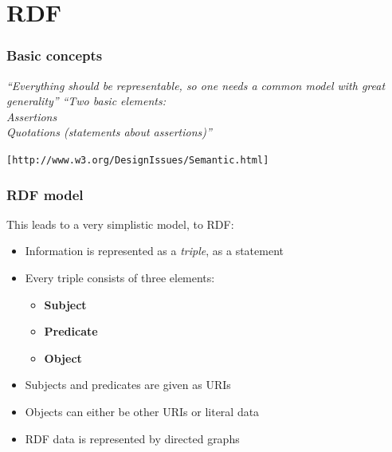 \documentclass[handout]{beamer}
\begin{document}
    \section{RDF}

        \begin{frame}
            \frametitle{Basic concepts}

            \large
            \textit{``Everything should be representable, so one needs a common model with great generality''}
            \vskip 0.3cm
            \textit{``Two basic elements:\\
            Assertions\\
            Quotations (statements about assertions)''}
            \vskip 0.3cm
            \begin{flushright}
                \texttt{[http://www.w3.org/DesignIssues/Semantic.html]}
            \end{flushright}
        \end{frame}


        \begin{frame}
            \frametitle{RDF model}

            This leads to a very simplistic model, to RDF:
            \vskip 0.7cm
            \pause

            \begin{itemize}
                \item Information is represented as a \textit{triple}, as a statement
                \pause
                \item Every triple consists of three elements:
                \pause
                \begin{itemize}
                    \item \textbf{Subject}
                    \pause
                    \item \textbf{Predicate}
                    \pause
                    \item \textbf{Object}
                    \pause
               \end{itemize}
               \item Subjects and predicates are given as URIs
               \pause
               \item Objects can either be other URIs or literal data
               \pause
               \item RDF data is represented by directed graphs 
           \end{itemize}
        \end{frame}
\end{document}
